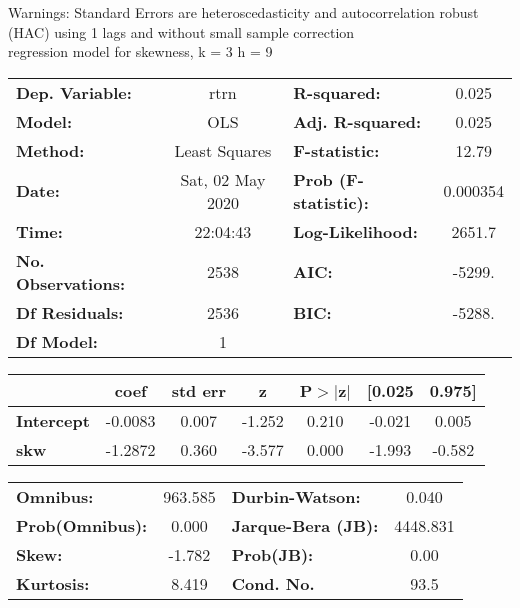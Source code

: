 Warnings: \newline
 [1] Standard Errors are heteroscedasticity and autocorrelation robust (HAC) using 1 lags and without small sample correction\\ 

regression model for skewness, k = 3 h = 9\begin{center}
\begin{tabular}{lclc}
\toprule
\textbf{Dep. Variable:}    &       rtrn       & \textbf{  R-squared:         } &     0.025   \\
\textbf{Model:}            &       OLS        & \textbf{  Adj. R-squared:    } &     0.025   \\
\textbf{Method:}           &  Least Squares   & \textbf{  F-statistic:       } &     12.79   \\
\textbf{Date:}             & Sat, 02 May 2020 & \textbf{  Prob (F-statistic):} &  0.000354   \\
\textbf{Time:}             &     22:04:43     & \textbf{  Log-Likelihood:    } &    2651.7   \\
\textbf{No. Observations:} &        2538      & \textbf{  AIC:               } &    -5299.   \\
\textbf{Df Residuals:}     &        2536      & \textbf{  BIC:               } &    -5288.   \\
\textbf{Df Model:}         &           1      & \textbf{                     } &             \\
\bottomrule
\end{tabular}
\begin{tabular}{lcccccc}
                   & \textbf{coef} & \textbf{std err} & \textbf{z} & \textbf{P$> |$z$|$} & \textbf{[0.025} & \textbf{0.975]}  \\
\midrule
\textbf{Intercept} &      -0.0083  &        0.007     &    -1.252  &         0.210        &       -0.021    &        0.005     \\
\textbf{skw}       &      -1.2872  &        0.360     &    -3.577  &         0.000        &       -1.993    &       -0.582     \\
\bottomrule
\end{tabular}
\begin{tabular}{lclc}
\textbf{Omnibus:}       & 963.585 & \textbf{  Durbin-Watson:     } &    0.040  \\
\textbf{Prob(Omnibus):} &   0.000 & \textbf{  Jarque-Bera (JB):  } & 4448.831  \\
\textbf{Skew:}          &  -1.782 & \textbf{  Prob(JB):          } &     0.00  \\
\textbf{Kurtosis:}      &   8.419 & \textbf{  Cond. No.          } &     93.5  \\
\bottomrule
\end{tabular}
\end{center}

